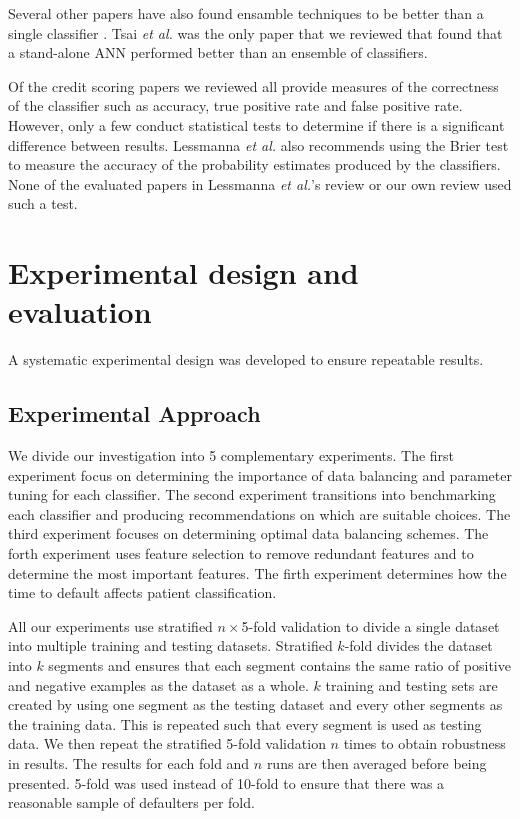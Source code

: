 \documentclass{sig-alternate-05-2015}
\begin{document}
	Several other papers have also found ensamble techniques to be better than a single classifier \cite{Hsieh2010534, Nanni20093028, Twala20103326, Wang2011223}. Tsai \textit{et al.} \cite{Tsai20082639} was the only paper that we reviewed that found that a stand-alone ANN performed better than an ensemble of classifiers.
	
	Of the credit scoring papers we reviewed \cite{Abdou2016, Angelini2008733, Bekhet201420, Danenas20153194, Desai199624, Hsieh2010534, Huang2004543, Huang2007847, Lee2002245, Li2006772, Luo20097562, Malhotra200383, Nanni20093028, Tsai20082639, Twala20103326, Wang2011223} all provide measures of the correctness of the classifier such as accuracy, true positive rate and false positive rate. However, only a few \cite{Desai199624, Huang2004543, Malhotra200383, Wang2011223} conduct statistical tests to determine if there is a significant difference between results. Lessmanna \textit{et al.} also recommends using the Brier test to measure the accuracy of the probability estimates produced by the classifiers. None of the evaluated papers in Lessmanna \textit{et al.}'s review or our own review used such a test.
	
	\section{Experimental design and evaluation}
	A systematic experimental design was developed to ensure repeatable results.
	\subsection{Experimental Approach}
	\label{method-approach}
	We divide our investigation into 5 complementary experiments. The first experiment focus on determining the importance of data balancing and parameter tuning for each classifier. The second experiment transitions into benchmarking each classifier and producing recommendations on which are suitable choices. The third experiment focuses on determining optimal data balancing schemes. The forth experiment uses feature selection to remove redundant features and to determine the most important features. The firth experiment determines how the time to default affects patient classification.
	
	All our experiments use stratified $n\times$5-fold validation to divide a single dataset into multiple training and testing datasets. Stratified $k$-fold divides the dataset into $k$ segments and ensures that each segment contains the same ratio of positive and negative examples as the dataset as a whole. $k$ training and testing sets are created by using one segment as the testing dataset and every other segments as the training data. This is repeated such that every segment is used as testing data. We then repeat the stratified 5-fold validation $n$ times to obtain robustness in results. The results for each fold and $n$ runs are then averaged before being presented. 5-fold was used instead of 10-fold to ensure that there was a reasonable sample of defaulters per fold.
	
\end{document}

